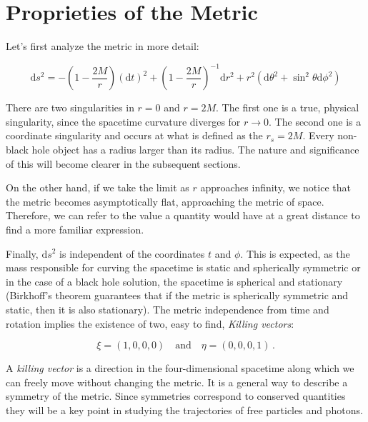 \newpage


\section{Proprieties of the Metric}

Let's first analyze the \Sh metric in more detail:

\begin{equation}
    \mathrm{d}s^2 = - \left(1 - \frac{2 M}{r} \right) (\mathrm{d}t)^2
    + \left(1 - \frac{2 M}{r} \right)^{-1} \mathrm{d}r^2
    + r^2 (\mathrm{d}\theta^2 + \sin^2 \theta \mathrm{d}\phi^2)
    \label{cap1:eq:Sh_ds}
\end{equation}

There are two singularities in $r = 0$ and $r = 2M$.
The first one is a true, physical singularity, since the spacetime curvature
diverges for $r \rightarrow 0$.
The second one is a coordinate singularity and occurs at what is defined as the
\Sh $r_s = 2M$.
Every non-black hole object has a radius larger than its \Sh radius.
The nature and significance of this will become clearer in the subsequent
sections.

On the other hand, if we take the limit as $r$ approaches infinity, we notice
that the metric becomes asymptotically flat, approaching the metric of \Mi
space.
Therefore, we can refer to the value a quantity would have at a great distance
to find a more familiar expression.

Finally, $\mathrm{d}s^2$ is independent of the coordinates $t$ and $\phi$.
This is expected, as the mass responsible for curving the spacetime is static
and spherically symmetric or in the case of a black hole solution, the spacetime
is spherical and stationary (Birkhoff’s theorem guarantees that if the metric is
spherically symmetric and static, then it is also stationary).
The metric independence from time and rotation implies the existence of two,
easy to find, \textit{Killing vectors}:

\begin{equation}
    \xi = (1, 0, 0, 0) \quad \text{and} \quad \eta = (0, 0, 0, 1) \, .
    \label{cap1:eq:xi_eta}
\end{equation}

A \textit{killing vector} is a direction in the four-dimensional spacetime
along which we can freely move without changing the metric.
It is a general way to describe a symmetry of the metric.
Since symmetries correspond to conserved quantities they will be a key point in
studying the trajectories of free particles and photons.

